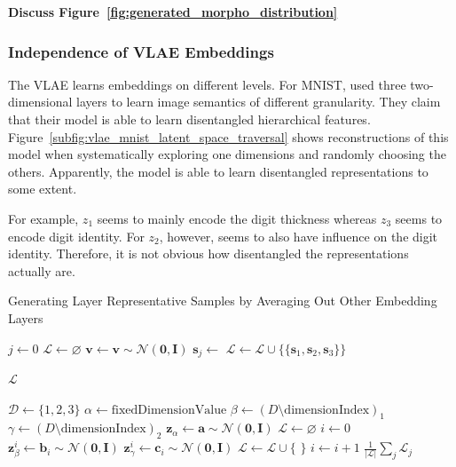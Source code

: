 \textbf{Discuss Figure~\ref{fig:generated_morpho_distribution}}

\subsubsection{Independence of VLAE Embeddings}\label{subsec:independence-of-vlae-embeddings}

The VLAE learns embeddings on different levels.
For MNIST, \citet{zhao2017learning} used three two-dimensional layers to learn image semantics of different granularity.
They claim that their model is able to learn disentangled hierarchical features.
Figure~\ref{subfig:vlae_mnist_latent_space_traversal} shows reconstructions of this model when systematically exploring one dimensions and randomly choosing the others.
Apparently, the model is able to learn disentangled representations to some extent.

For example, $z_1$ seems to mainly encode the digit thickness whereas $z_3$ seems to encode digit identity.
For $z_2$, however, seems to also have influence on the digit identity.
Therefore, it is not obvious how disentangled the representations actually are.
\begin{breakablealgorithm}
    \caption{Generating Layer Representative Samples by Averaging Out Other Embedding Layers}\label{alg:layer_representative_samples}
    \begin{algorithmic}[1]
            \State $j \gets 0$
            \State $\mathcal{L}\gets \varnothing$
                \State $\bm{v} \gets \bm{v} \sim \mathcal{N}(\bm{0}, \bm{I})$\label{line:fixing_v}
                    \State $\bm{s}_j \gets$ 
        \EndFor
        \State $\mathcal{L} \gets \mathcal{L} \cup \{\{\bm{s}_1, \bm{s}_2, \bm{s}_3\}\}$

        \EndWhile
        \State \Return $\mathcal{L}$
        \EndFunction

        \State $\mathcal{D} \gets \{1,2,3\}$
        \State $\alpha \gets \text{fixedDimensionValue}$
        \State $\beta \gets (D \setminus \text{dimensionIndex})_1$
        \State $\gamma \gets (D \setminus \text{dimensionIndex})_2$
        \State $\bm{z}_{\alpha} \gets \bm{a} \sim \mathcal{N}(\bm{0}, \bm{I})$
        \State $\mathcal{L}\gets \varnothing$
        \State $i \gets 0$
        \State $\bm{z}_{\beta}^i \gets \bm{b}_i \sim \mathcal{N}(\bm{0}, \bm{I})$
        \State $\bm{z}_{\gamma}^i \gets \bm{c}_i \sim \mathcal{N}(\bm{0}, \bm{I})$
        \State $\mathcal{L} \gets \mathcal{L} \cup \{$  $\}$
        \State $i \gets i + 1$
        \EndWhile
        \State \Return $\frac{1}{|\mathcal{L}|}\sum_j \mathcal{L}_j$
        \EndFunction
    \end{algorithmic}
\end{breakablealgorithm}

